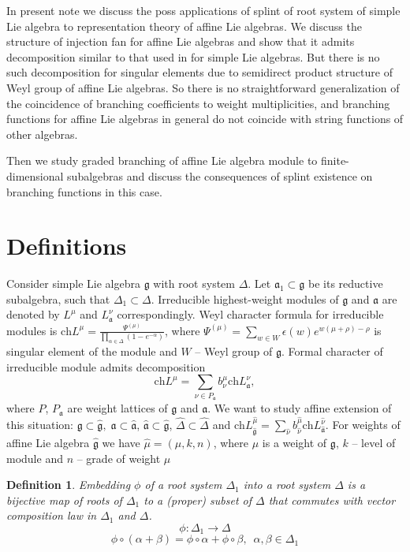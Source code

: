 \documentclass[12pt]{article}
\newtheorem{Def}{Definition}[section]
\newcommand{\gf}{\mathfrak{g}}
\newcommand{\af}{\mathfrak{a}}
\newcommand{\gfh}{\hat{\mathfrak{g}}}
\newcommand{\afh}{\hat{\mathfrak{a}}}
\begin{document}
In present note we discuss the poss applications of splint of root system of simple Lie algebra to representation theory of affine Lie algebras. We discuss the structure of injection fan for affine Lie algebras and show that it admits decomposition similar to that used in \cite{2011arXiv1111.6787L} for simple Lie algebras. But there is no such decomposition for singular elements due to semidirect product structure of Weyl group of affine Lie algebras. So there is no straightforward generalization of the coincidence of branching coefficients to weight multiplicities, and branching functions for affine Lie algebras in general do not coincide with string functions of other algebras. 

Then we study graded branching of affine Lie algebra module to finite-dimensional subalgebras and discuss the consequences of splint existence on branching functions in this case. 

\section{Definitions}
\label{sec:definitions}

Consider simple Lie algebra $\gf$ with root system $\Delta$. Let $\af_{1}\subset \gf$ be its reductive subalgebra, such that $\Delta_{1}\subset\Delta$. Irreducible highest-weight modules of $\gf$ and $\af$ are denoted by $L^{\mu}$ and $L^{\nu}_{\af}$ correspondingly. Weyl character formula for irreducible modules is $\mathrm{ch}L^{\mu}=\frac{\Psi^{(\mu)}}{\prod_{\alpha\in\Delta}(1-e^{-\alpha})}$, where $\Psi^{(\mu)}=\sum_{w\in W}\epsilon(w) e^{w(\mu+\rho)-\rho}$ is singular element of the module and $W$ -- Weyl group of $\gf$. Formal character of irreducible module admits decomposition
\begin{equation}
  \label{eq:4}
  \mathrm{ch} L^{\mu}=\sum_{\nu\in P_{\af}} b^{\mu}_{\nu} \mathrm{ch} L^{\nu}_{\af},
\end{equation}
where $P$, $P_{\af}$ are weight lattices of $\gf$ and $\af$.
We want to study affine extension of this situation: $\gf\subset\gfh,\; \af\subset\afh$, $\afh\subset\gfh$, $\hat{\Delta}\subset\hat{\Delta}$ and $\mathrm{ch}L^{\hat{\mu}}_{\gfh}=\sum_{\hat{\nu}} b^{\hat{\mu}}_{\hat{\nu}} \mathrm{ch} L^{\hat{\nu}}_{\afh}$. For weights of affine Lie algebra $\gfh$ we have $\hat{\mu}=(\mu,k,n)$, where $\mu$ is a weight of $\gf$, $k$ -- level of module and $n$ -- grade of weight $\hat{\mu}$

\begin{Def}
Embedding $\phi$ of a root system $\Delta_1$ into a root system $\Delta$ is a bijective map of roots of $\Delta_{1}$ to a (proper) 
subset of $\Delta$ that commutes with vector composition law in $\Delta_{1}$ and $\Delta$.
\begin{equation*}
\phi:\Delta_1 \longrightarrow \Delta
\end{equation*}
\begin{equation*}
\phi \circ (\alpha + \beta) =\phi \circ \alpha + \phi \circ \beta,
\,\,\, \alpha,\beta \in \Delta_1
\end{equation*}
  
\end{Def}
\end{document}
